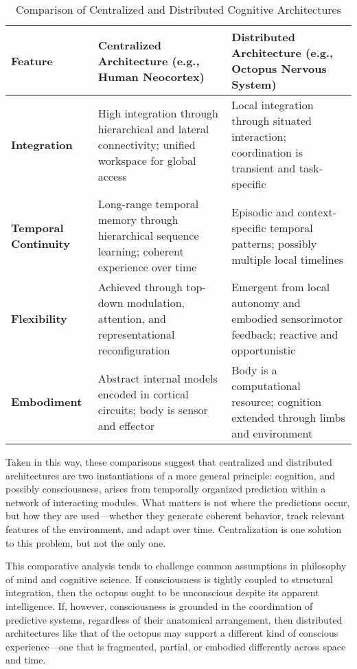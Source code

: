 \documentclass{article}
\begin{document}
\vspace{1em}
\begin{table}[ht]
\centering
\small
\caption{Comparison of Centralized and Distributed Cognitive Architectures}
\vspace{0.75em}
\begin{tabular}{|m{2.25cm}|m{4.25cm}|m{4.25cm}|}
\hline
\textbf{Feature} & \textbf{Centralized Architecture (e.g., Human Neocortex)} & \textbf{Distributed Architecture (e.g., Octopus Nervous System)} \\
\hline
\textbf{Integration} & High integration through hierarchical and lateral connectivity; unified workspace for global access & Local integration through situated interaction; coordination is transient and task-specific \\
\hline
\textbf{Temporal Continuity} & Long-range temporal memory through hierarchical sequence learning; coherent experience over time & Episodic and context-specific temporal patterns; possibly multiple local timelines \\
\hline
\textbf{Flexibility} & Achieved through top-down modulation, attention, and representational reconfiguration & Emergent from local autonomy and embodied sensorimotor feedback; reactive and opportunistic \\
\hline
\textbf{Embodiment} & Abstract internal models encoded in cortical circuits; body is sensor and effector & Body is a computational resource; cognition extended through limbs and environment \\
\hline
\end{tabular}
\label{tab:architecture_comparison}
\end{table}
\vspace{1em}

Taken in this way, these comparisons suggest that centralized and distributed architectures are two instantiations of a more general principle: cognition, and possibly consciousness, arises from temporally organized prediction within a network of interacting modules. What matters is not where the predictions occur, but how they are used—whether they generate coherent behavior, track relevant features of the environment, and adapt over time. Centralization is one solution to this problem, but not the only one.

This comparative analysis tends to challenge common assumptions in philosophy of mind and cognitive science. If consciousness is tightly coupled to structural integration, then the octopus ought to be unconscious despite its apparent intelligence. If, however, consciousness is grounded in the coordination of predictive systems, regardless of their anatomical arrangement, then distributed architectures like that of the octopus may support a different kind of conscious experience—one that is fragmented, partial, or embodied differently across space and time.
\end{document}
